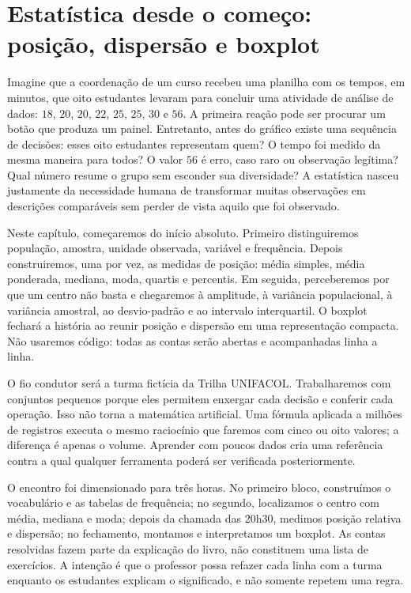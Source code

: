 \chapter[Estatística I]{Estatística desde o começo: posição, dispersão e boxplot}

Imagine que a coordenação de um curso recebeu uma planilha com os tempos, em minutos, que oito estudantes levaram para concluir uma atividade de análise de dados: $18$, $20$, $20$, $22$, $25$, $25$, $30$ e $56$. A primeira reação pode ser procurar um botão que produza um painel. Entretanto, antes do gráfico existe uma sequência de decisões: esses oito estudantes representam quem? O tempo foi medido da mesma maneira para todos? O valor $56$ é erro, caso raro ou observação legítima? Qual número resume o grupo sem esconder sua diversidade? A estatística nasceu justamente da necessidade humana de transformar muitas observações em descrições comparáveis sem perder de vista aquilo que foi observado.

Neste capítulo, começaremos do início absoluto. Primeiro distinguiremos população, amostra, unidade observada, variável e frequência. Depois construiremos, uma por vez, as medidas de posição: média simples, média ponderada, mediana, moda, quartis e percentis. Em seguida, perceberemos por que um centro não basta e chegaremos à amplitude, à variância populacional, à variância amostral, ao desvio-padrão e ao intervalo interquartil. O boxplot fechará a história ao reunir posição e dispersão em uma representação compacta. Não usaremos código: todas as contas serão abertas e acompanhadas linha a linha.

O fio condutor será a turma fictícia da Trilha UNIFACOL. Trabalharemos com conjuntos pequenos porque eles permitem enxergar cada decisão e conferir cada operação. Isso não torna a matemática artificial. Uma fórmula aplicada a milhões de registros executa o mesmo raciocínio que faremos com cinco ou oito valores; a diferença é apenas o volume. Aprender com poucos dados cria uma referência contra a qual qualquer ferramenta poderá ser verificada posteriormente.

O encontro foi dimensionado para três horas. No primeiro bloco, construímos o vocabulário e as tabelas de frequência; no segundo, localizamos o centro com média, mediana e moda; depois da chamada das 20h30, medimos posição relativa e dispersão; no fechamento, montamos e interpretamos um boxplot. As contas resolvidas fazem parte da explicação do livro, não constituem uma lista de exercícios. A intenção é que o professor possa refazer cada linha com a turma enquanto os estudantes explicam o significado, e não somente repetem uma regra.

